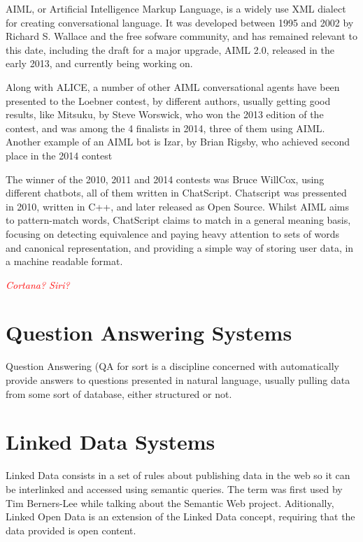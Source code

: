 AIML, or Artificial Intelligence Markup Language, is a widely use XML dialect for creating conversational language. It was developed between 1995 and 2002 by Richard S. Wallace and the free sofware community, and has remained relevant to this date, including the draft for a major upgrade, AIML 2.0, released in the early 2013, and currently being working on.

Along with ALICE, a number of other AIML conversational agents have been presented to the Loebner contest, by different authors, usually getting good results, like Mitsuku, by Steve Worswick, who won the 2013 edition of the contest, and was among the 4 finalists in 2014, three of them using AIML. Another example of an AIML bot is Izar, by Brian Rigsby, who achieved second place in the 2014 contest

The winner of the 2010, 2011 and 2014 contests was Bruce WillCox, using different chatbots, all of them written in ChatScript. Chatscript was pressented in 2010, written in C++, and later released as Open Source. Whilst AIML aims to pattern-match words, ChatScript claims to match in a general meaning basis, focusing on detecting equivalence and paying heavy attention to sets of words and canonical representation, and providing a simple way of storing user data, in a machine readable format.

\emph{\textcolor{red}{Cortana? Siri?}}

\section{Question Answering Systems}
\label{sec:qa_sys}

Question Answering (QA for sort is a discipline concerned with automatically provide answers to questions presented in natural language, usually pulling data from some sort of database, either structured or not.


\section{Linked Data Systems}
\label{sec:linkd_sys}

Linked Data consists in a set of rules about publishing data in the web so it can be interlinked and accessed using semantic queries. The term was first used by Tim Berners-Lee while talking about the Semantic Web project. Aditionally, Linked Open Data is an extension of the Linked Data concept, requiring that the data provided is open content.
